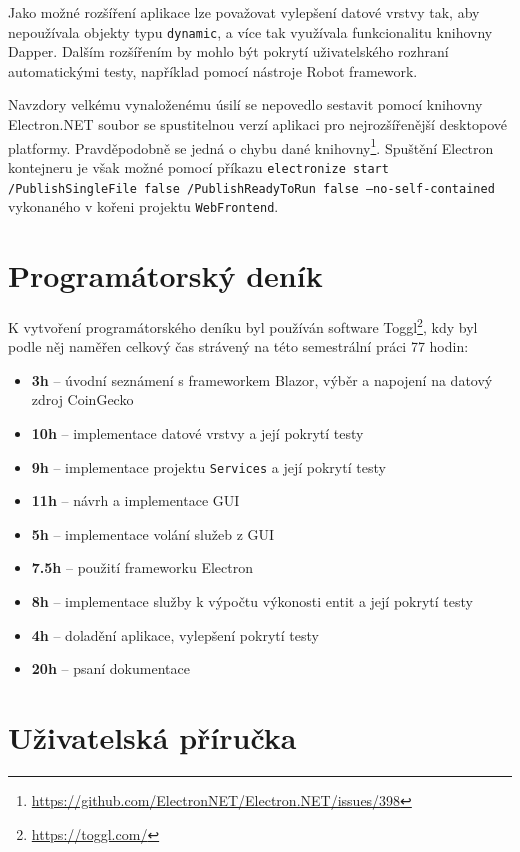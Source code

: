 \documentclass[12pt, a4paper]{article}
\begin{document}
    Jako možné rozšíření aplikace lze považovat vylepšení datové vrstvy tak, aby nepoužívala objekty typu \texttt{dynamic},
    a více tak využívala funkcionalitu knihovny Dapper.
    Dalším rozšířením by mohlo být pokrytí uživatelského rozhraní automatickými testy, například pomocí nástroje Robot
    framework.
    
    Navzdory velkému vynaloženému úsilí se nepovedlo sestavit pomocí knihovny Electron.NET soubor se spustitelnou verzí aplikaci
    pro nejrozšířenější desktopové platformy. Pravděpodobně se jedná o chybu dané knihovny\footnote{\url{https://github.com/ElectronNET/Electron.NET/issues/398}}.
    Spuštění Electron kontejneru je však možné pomocí příkazu 
    \texttt{electronize start /PublishSingleFile false /PublishReadyToRun false --no-self-contained} vykonaného v 
    kořeni projektu \texttt{WebFrontend}.
    
    \section{Programátorský deník}
    K vytvoření programátorského deníku byl používán software Toggl\footnote{\url{https://toggl.com/}}, kdy byl podle něj
    naměřen celkový čas strávený na této semestrální práci 77 hodin:
    
    \begin{itemize}
        \item \textbf{3h} -- úvodní seznámení s frameworkem Blazor, výběr a napojení na datový zdroj CoinGecko
        \item \textbf{10h} -- implementace datové vrstvy a její pokrytí testy
        \item \textbf{9h} -- implementace projektu \texttt{Services} a její pokrytí testy
        \item \textbf{11h} -- návrh a implementace GUI
        \item \textbf{5h} -- implementace volání služeb z GUI
        \item \textbf{7.5h} -- použití frameworku Electron
        \item \textbf{8h} -- implementace služby k výpočtu výkonosti entit a její pokrytí testy
        \item \textbf{4h} -- doladění aplikace, vylepšení pokrytí testy
        \item \textbf{20h} -- psaní dokumentace
    \end{itemize}
    
    \section{Uživatelská příručka}
    
\end{document}
